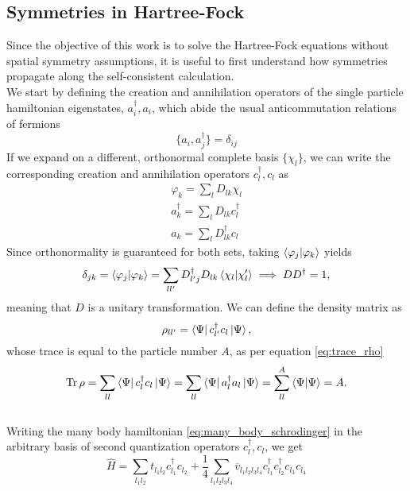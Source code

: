 \subsection{Symmetries in Hartree-Fock}
Since the objective of this work is to solve the Hartree-Fock equations without spatial symmetry assumptions, it is useful to first understand how symmetries propagate along the self-consistent calculation.
\\We start by defining the creation and annihilation operators of the single particle hamiltonian eigenstates, $a_i^\dagger, a_i$, which abide the usual anticommutation relations of fermions
\begin{equation}
    \label{eq:fermion_anticommutations}
    \{a_i, a_j^\dagger\} = \delta_{ij}
\end{equation}
If we expand on a different, orthonormal complete basis $\{\chi_l\}$, we can write the corresponding creation and annihilation operators $c_l^\dagger, c_l$ as
\begin{align}
    \label{eq:basis_change}
    \varphi_k = \sum_l D_{lk} \chi_l\\
    a_k^\dagger = \sum_l D_{lk} c_l^\dagger\\
    a_k = \sum_l D_{lk}^\dagger c_l
\end{align}
Since orthonormality is guaranteed for both sets, taking $\bra{\varphi_j}\ket{\varphi_k}$ yields 
\begin{equation}
    \label{eq:Disunitary}
    \delta_{jk} = \bra{\varphi_j}\ket{\varphi_k} = \sum_{ll'} D_{l'j}^\dagger D_{lk}\bra{\chi_l}\ket{\chi_l'}\implies DD^\dagger = 1,
\end{equation}
meaning that $D$ is a unitary transformation.
We can define the density matrix as
\begin{equation}
    \label{eq:density_op}
    \rho_{ll'} = \bra{\Psi}c_{l'}^\dagger c_l\ket{\Psi},
\end{equation}
whose trace is equal to the particle number $A$, as per equation \eqref{eq:trace_rho}
\begin{equation}
    \label{eq:trace_rho}
   \Tr \rho =  \sum_{ll}\bra{\Psi}c_{l}^\dagger c_l\ket{\Psi} = \sum_{ll}\bra{\Psi}a_l^\dagger a_l\ket{\Psi} = \sum_{ll}^A \bra{\Psi}\ket{\Psi} = A.
\end{equation}
\\Writing the many body hamiltonian \eqref{eq:many_body_schrodinger} in the arbitrary basis of second quantization operators $c_l^\dagger, c_l$, we get
\begin{equation}
    \label{eq:mb_hamiltonian_sq}
    \hat H = \sum_{l_1 l_2}t_{l_1l_2} c_{l_1}^\dagger c_{l_2} + \frac 1 4 \sum_{l_1 l_2 l_3 l_4}\overline{v}_{l_1l_2l_3l_4} c_{l_1}^\dagger c_{l_2}^\dagger c_{l_3} c_{l_4}
\end{equation}
